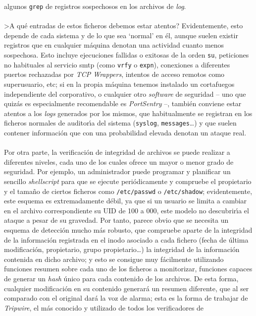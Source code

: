 algunos {\tt grep} de registros sospechosos en los archivos de {\it log}.\\
\\>A qu\'e entradas de estos ficheros debemos estar atentos? Evidentemente, esto
depende de cada sistema y de lo que sea `normal' en \'el, aunque suelen existir
registros que en cualquier m\'aquina denotan una actividad cuanto menos 
sospechosa. Esto incluye ejecuciones fallidas o exitosas de la orden {\tt su},
peticiones no habituales al servicio {\sc smtp} (como {\tt vrfy} o {\tt expn}),
conexiones a diferentes puertos rechazadas por {\it TCP Wrappers}, intentos de
acceso remotos como superusuario, etc; si en la propia m\'aquina tenemos 
instalado un cortafuegos independiente del corporativo, o cualquier otro {\it
software} de seguridad -- uno que quiz\'as es especialmente recomendable es 
{\it PortSentry} --, tambi\'en conviene estar atentos a los {\it logs} 
generados por los mismos, que habitualmente se registran en los ficheros 
normales de auditor\'{\i}a del sistema ({\tt syslog}, {\tt messages}\ldots) y
que suelen contener informaci\'on que con una probabilidad elevada denotan un
ataque real.\\
\\Por otra parte, la verificaci\'on de integridad de archivos se puede realizar 
a diferentes
niveles, cada uno de los cuales ofrece un mayor o menor grado de seguridad. Por
ejemplo, un administrador puede programar y planificar un sencillo {\it 
shellscript} para que se ejecute peri\'odicamente y compruebe el propietario y
el tama\~no de ciertos ficheros como {\tt /etc/passwd} o {\tt /etc/shadow}; 
evidentemente, este esquema es extremadamente d\'ebil, ya que si un usuario se
limita a cambiar en el archivo correspondiente su UID de 100 a 000, este modelo
no descubrir\'{\i}a el ataque a pesar de su gravedad. Por tanto, parece obvio
que se necesita un esquema de detecci\'on mucho m\'as robusto, que compruebe 
aparte de la integridad de la informaci\'on registrada en el inodo asociado a
cada fichero (fecha de \'ultima modificaci\'on, propietario, grupo 
propietario\ldots) la integridad de la informaci\'on contenida en dicho archivo;
y esto se consigue muy f\'acilmente utilizando funciones resumen sobre cada
uno de los ficheros a monitorizar, funciones capaces de generar un {\it hash}
\'unico para cada contenido de los archivos. De esta forma, cualquier 
modificaci\'on en su contenido generar\'a un resumen diferente, que al ser 
comparado con el original dar\'a la voz de alarma; esta es la forma de trabajar
de {\it Tripwire}, el m\'as conocido y utilizado de todos los verificadores de
